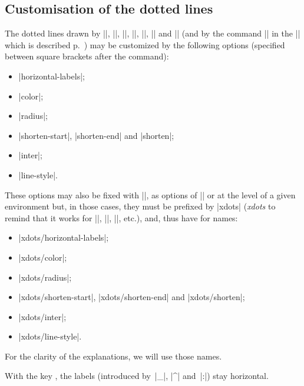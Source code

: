 \documentclass[dvipsnames]{article}%
\begin{document}
\subsection{Customisation of the dotted lines}

\label{customisation} 

The dotted lines drawn by |\Ldots|, |\Cdots|, |\Vdots|, |\Ddots|, |\Iddots|,
|\Hdotsfor| and |\Vdotsfor| (and by the command |\line| in the |\CodeAfter|
which is described p.~\pageref{line-in-code-after}) may be customized by the following
options (specified between square brackets after the command):
\begin{itemize}
\item |horizontal-labels|;
\item |color|;
\item |radius|;
\item |shorten-start|, |shorten-end| and |shorten|;
\item |inter|;
\item |line-style|.
\end{itemize}

These options may also be fixed with |\NiceMatrixOptions|, as options of
|\CodeAfter| or at the level of a given environment but, in those cases, they
must be prefixed by |xdots| (\textsl{xdots} to remind that it works for
|\Cdots|, |\Ldots|, |\Vdots|, etc.), and, thus have for names:
\begin{itemize}
\item |xdots/horizontal-labels|;
\item |xdots/color|;
\item |xdots/radius|;
\item |xdots/shorten-start|, |xdots/shorten-end| and |xdots/shorten|;
\item |xdots/inter|;
\item |xdots/line-style|.
\end{itemize}

For the clarity of the explanations, we will use those names.


\bigskip
With the key , the labels (introduced by~|_|,
|^| and~|:|) stay horizontal.
\end{document}
